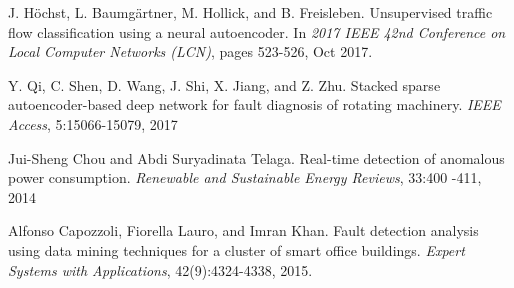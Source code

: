\documentclass[conference]{IEEEtran}
\begin{document}
\begin{thebibliography}{00}
J. H{\"o}chst, L. Baumg{\"a}rtner, M. Hollick, and B. Freisleben. Unsupervised traffic flow classification using a neural autoencoder.
In \textit{2017 IEEE 42nd Conference on Local Computer Networks
	(LCN)}, pages 523-526, Oct 2017.

Y. Qi, C. Shen, D. Wang, J. Shi, X. Jiang, and Z. Zhu. Stacked
sparse autoencoder-based deep network for fault diagnosis of rotating machinery. \textit{IEEE Access}, 5:15066-15079, 2017

Jui-Sheng Chou and Abdi Suryadinata Telaga. Real-time detection of anomalous power consumption. \textit{Renewable and Sustainable Energy Reviews}, 33:400 -411, 2014

Alfonso Capozzoli, Fiorella Lauro, and Imran Khan. Fault detection analysis using data mining techniques for a cluster of smart
office buildings. \textit{Expert Systems with Applications}, 42(9):4324-4338, 2015.
\end{thebibliography}
\end{document}
